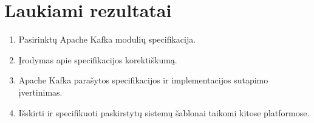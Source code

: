 \documentclass{VUMIFPSmagistrinis}
\begin{document}
	\section{Laukiami rezultatai}
		\begin{enumerate}
			\item{Pasirinktų Apache Kafka modulių specifikacija.}
			\item{Įrodymas apie specifikacijos korektiškumą.}
			\item{Apache Kafka parašytos specifikacijos ir implementacijos sutapimo įvertinimas.}
			\item{Išskirti ir specifikuoti paskirstytų sistemų šablonai taikomi kitose platformose.}
		\end{enumerate}
	
	\printbibliography[heading=bibintoc] 


\appendix
\end{document}
